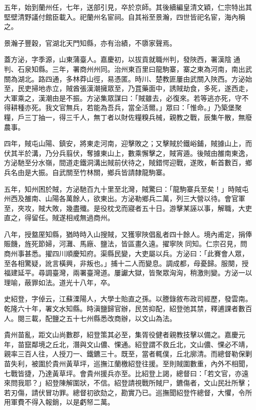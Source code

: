 \begin{pinyinscope}
五年，始到蘭州任，七年，送部引見，卒於京師。其後續編皇清文穎，仁宗特出其堅壁清野議付館臣載入。祀蘭州名宦祠。自其裕至景瀚，四世皆祀名宦，海內稱之。

景瀚子豐穀，官湖北天門知縣，亦有治績，不隳家聲焉。

蓋方泌，字季源，山東蒲臺人。嘉慶初，以拔貢就職州判，發陜西，署漢陰通判、石泉知縣。三年，署商州州同。治州東百里曰龍駒寨，寨之東為河南，南出武關為湖北。路四通，多林莽山徑，易憑匿。時川、楚教匪屢由武關入陜西。方泌始至，民吏掃地赤立，賊酋張漢潮擁眾至，乃罝藥面中，誘賊劫食，多死，遂西走，大軍乘之，漢潮由是不振。方泌集眾謀曰：「賊雖去，必復來。若等逃亦死，守不得耕種亦死。我文官無兵，若能為吾兵，當全活爾。」眾曰：「惟命。」乃築堡聚糧，戶三丁抽一，得三千人，無丁者以財佐糧糗兵械，親教之戰，辰集午散，無廢農事。

四年，賊屯山陽、鎮安，將東走河南，迎擊敗之；又擊賊於鐵峪鋪，賊據山上，而伏其半於溝，乃分兵翦伏，奪據東山上，數乘懈擊之，賊宵遁。後賊由雒南東逸，方泌馳至分水嶺，間道走鐵洞溝出賊前伏待之，賊錯愕迎戰，遂敗，斬首數百，鄉兵名由是大振。自武關至竹林關，鄉兵皆請隸龍駒寨。

五年，知州困於賊，方泌馳百九十里至北灣，賊驚曰：「龍駒寨兵至矣！」時賊屯州西及雒南、山陽各萬餘人，欲東出。方泌勒鄉兵二萬，列三大營以待。會官軍至，夾攻，賊大敗，幾盡殲。是役枕戈而寢者五十日。游擊某誣以事，解職，大吏直之，得留任。賊遂相戒無過商州。

八年，授盩厔知縣，猶時時入山搜賊，又獲寧陜倡亂者四十餘人。境內甫定，捐俸賑饑，旌死節婦，河灘、馬廠、鹽法，皆區畫久遠。擢寧陜同知。仁宗召見，問商州事甚悉。擢四川順慶知府。渠縣民變，大吏屬以兵。方泌曰：「此賽會人眾，至各相驚疑，訛言橫興，非叛也。」捕十二人而變息。調成都，母憂歸。服闋，授福建延平。尋調臺灣，兩署臺灣道。屢讞大獄，皆聚眾洶洶，稍激則變。方泌一以理喻，蔽罪如法。道光十八年，卒。

史紹登，字倬云，江蘇溧陽人，大學士貽直之孫。以謄錄敘布政司經歷，發雲南。乾隆六十年，署文水知縣。時滇鹽歸官辦，民苦抑配，紹登弛其禁，釋逋課者數百人。閱三載，配鹽之五十七州縣悉改商辦，以文山為法。

貴州苗亂，距文山尚數郡，紹登策其必至，集胥役健者親教技擊以備之。嘉慶元年，苗竄鄰境之丘北，潛與文山儂、惈通。紹登謂不救丘北，文山儂、惈必不靖，親率三百人往，人授刀一、鐵鑣三十。既至，當者輒僕，丘北廓清。而總督勒保剿苗失利，被圍於貴州黃草坪，巡撫江蘭檄紹登往援。至則賊圍數重，內外不相聞，七戰皆捷，乃達黃草坪。會貴州援兵亦至。比紹登上謁，總督曰：「若文官，亦遠來問我耶？」紹登陳解圍狀，不信。紹登請視戰所賊尸，鑣傷者，文山民壯所擊；若刃傷，請伏冒功罪。總督初欲劾之，勘實乃已。巡撫聞紹登忤總督，大懼，令所用軍費不得入報銷，以是虧帑二萬。


\end{pinyinscope}
